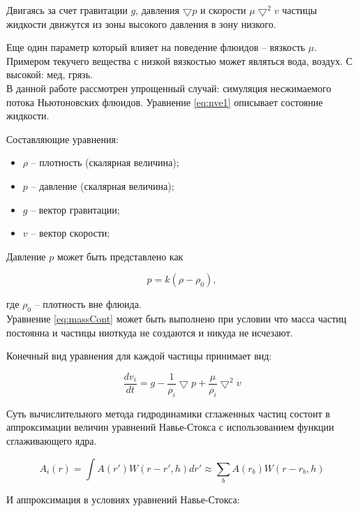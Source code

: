 Двигаясь за счет гравитации $g$, давления $\bigtriangledown{}p$ и скорости $\mu\bigtriangledown^2v$ частицы жидкости движутся из зоны высокого давления в зону низкого.

Еще один параметр который влияет на поведение флюидов -- вязкость $\mu$.
Примером текучего вещества с низкой вязкостью может являться вода, воздух.
С высокой: мед, грязь. \\

В данной работе рассмотрен упрощенный случай: симуляция несжимаемого потока
Ньютоновских флюидов. Уравнение \eqref{eq:nve1} описывает состояние жидкости.

Составляющие уравнения:

\begin{itemize}
  \item $\rho$ -- плотность (скалярная величина);
  \item $p$ -- давление (скалярная величина);
  \item $g$ -- вектор гравитации;
  \item $v$ -- вектор скорости;
\end{itemize}

Давление $p$ может быть представлено как

\begin{equation}
\label{eq:pressure}
  p = k(\rho - \rho_0),
\end{equation}

где $\rho_0$ -- плотность вне флюида. \\

Уравнение \eqref{eq:massCont} может быть выполнено при условии что масса частиц
постоянна и частицы ниоткуда не создаются и никуда не исчезают.

Конечный вид уравнения для каждой частицы принимает вид:

\begin{equation}
\label{eq:}
\frac{dv_i}{dt} = g - \frac{1}{\rho_i}\bigtriangledown{}p + \frac{\mu}{\rho_i}\bigtriangledown^2v
\end{equation}

Суть вычислительного метода гидродинамики сглаженных частиц состоит в аппроксимации величин
уравнений Навье-Стокса с использованием функции сглаживающего ядра.

\begin{equation}
\label{eq:mon1992}
A_i(r) = \int{}A(r')W(r - r', h)dr' \approx \sum_{b}A(r_b)W(r - r_b, h)
\end{equation}

И аппроксимация в условиях уравнений Навье-Стокса:

